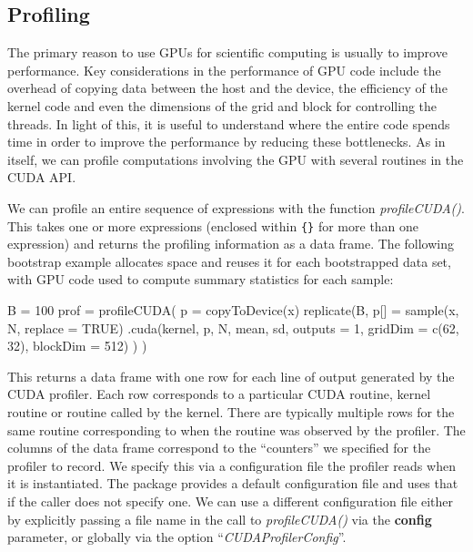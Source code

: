 \documentclass[article]{jss}
\def\R{\proglang{R}}
\def\Rpkg#1{\pkg{#1}}
\def\Rfunc#1{\textsl{#1()}}
\def\Rarg#1{\textbf{#1}}
\def\Roption#1{\dquote{\textsl{#1}}}
\def\dquote#1{``#1''}
\begin{document}
\subsection{Profiling}
The primary reason to use GPUs for scientific computing is usually to improve
performance. Key considerations in the performance of GPU code include 
the overhead of copying data between the host and the device, the 
efficiency of the kernel code and even the
dimensions of the grid and block for controlling the threads.
In light of this, it is
useful to understand where the entire code spends time in order to
improve the performance by reducing these bottlenecks.  As in \R{}
itself, we can profile computations involving the GPU with several
routines in the CUDA API.


We can profile an entire sequence of \R{} expressions with the \R{}
function \Rfunc{profileCUDA}.  This takes one or more \R{} expressions
(enclosed within \texttt{\{\}} for more than one expression) and returns the
profiling information as a data frame.
The following bootstrap example allocates space and reuses it for each
bootstrapped data set, with GPU code used to compute summary statistics 
for each sample:  
\begin{RCode}
B = 100
prof = profileCUDA( {
  p = copyToDevice(x)
  replicate(B, {
      p[] = sample(x, N, replace = TRUE)
      .cuda(kernel, p, N, mean, sd, outputs = 1,  
                   gridDim = c(62, 32), blockDim = 512)
  })
})
\end{RCode}
This returns a data frame with one row for each line of output generated
by the CUDA profiler.  Each row corresponds to a particular CUDA
routine, kernel routine or routine called by the kernel.  There are
typically multiple rows for the same routine corresponding to when the
routine was observed by the profiler.  The columns of the data frame
correspond to the \dquote{counters} we specified for the profiler to
record.  We specify this via a configuration file the profiler reads
when it is instantiated. The \Rpkg{RCUDA} package provides a default
configuration file and uses that if the caller does not specify one.
We can use a different configuration file either by explicitly passing
a file name in the call to \Rfunc{profileCUDA} via the \Rarg{config}
parameter, or globally via the \R{} option
\Roption{CUDAProfilerConfig}.
\end{document}
